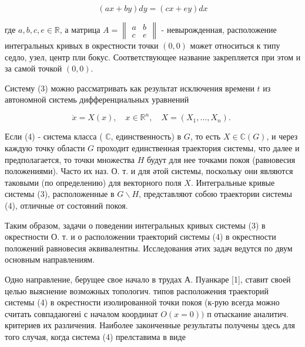 \documentclass[10pt]{article}
\begin{document}
\[

(a x+b y) d y=(c x+e y) d x

\]



где $a, b, c, e \in \mathbb{R}$, а матрица $A=\left\|\begin{array}{ll}a & b \\ c & e\end{array}\right\|$ - невырожденная, расположение интегральных кривых в окрестности точки $(0,0)$ может относиться к типу седло, узел, центр пли бокус. Соответствующее название закрепляется при этом и за самой точкой $(0,0)$.



Систему (3) можно рассматривать как результат исключения времени $t$ из автономной системь дифференциальных уравнений



\[

\dot{x}=X(x), \quad x \in \mathbb{R}^{n}, \quad X=\left(X_{1}, \ldots, X_{n}\right) \text {. }

\]



Если (4) - система класса ( $\mathbb{C}$, единственность) в $G$, то есть $X \in \mathbb{C}(G)$, и через каждую точку области $G$ проходит единственная траектория системы, что далее и предполагается, то точки множества $H$ будут для нее точками покоя (равновесия положениями). Часто их наз. О. т. и для әтой системы, поскольку они являются таковыми (по определению) для векторного поля $X$. Интегральные кривые системы (3), расположенные в $G \backslash H$, представляют собою траектории системы (4), отличные от состояний покоя.



Таким образом, задачи о поведении интегральных кривых системы (3) в окрестности О. т. и о расположении траекторий системы (4) в окрестности положений равновесия әквивалентны. Исследования әтих задач ведутся по двум основным направлениям.



Одно направление, берущее свое начало в трудах А. Пуанкаре [1], ставит своей целью выяснение возможных топологич. типов расположения траекторий системы (4) в окрестности изолированной точки покоя (к-рую всегда можно считать совпадаюгеиі с началом координат $O(x=0))$ п отыскание аналитич. критериев их различения. Наиболее законченные результаты получены здесь для того случая, когда система (4) прелставима в виде
\end{document}
